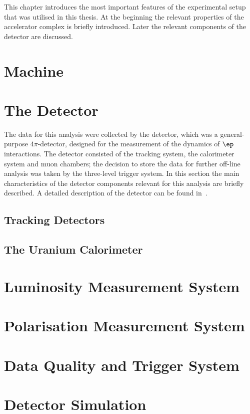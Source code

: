 This chapter introduces the most important features of the  experimental setup that was utilised in this thesis. At the beginning the relevant properties of the accelerator complex is briefly introduced. Later the relevant components of the \zeus detector are discussed.

\section{\hera Machine}
\label{sec:hera}


\section{The \zeus Detector}
\label{subsec:zeusdet}
The data for this analysis were collected by the \zeus detector, which was a general-purpose $4\pi$-detector, designed for the measurement of the dynamics of $\ep$ interactions. The \zeus detector consisted of the tracking system, the calorimeter system and muon chambers; the decision to store the data for further off-line analysis was taken by the three-level trigger system. In this section the main characteristics of the detector components relevant for this analysis are briefly described. A detailed description of the detector can be found in~\cite{zeus:1993:bluebook}.


\subsection{Tracking Detectors}
\label{subsec:trackdet}


\subsection{The Uranium Calorimeter}
\label{subsec:UCAL}


\section{Luminosity Measurement System}
\label{sec:lumimeas}


\section{Polarisation Measurement System}
\label{sec:polarmeas}


\section{Data Quality and Trigger System}
\label{sec:daqtrigger}


\section{Detector Simulation}
\label{sec:detsim}

